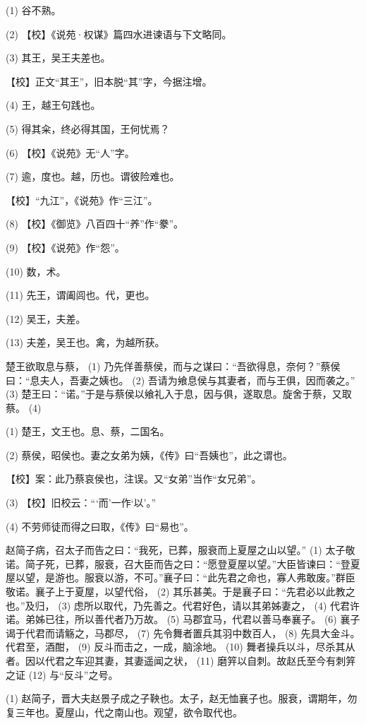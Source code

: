 \documentclass[12pt,UTF8]{ctexbook}
\begin{document}
(1) 谷不熟。

(2) 【校】《说苑·权谋》篇四水进谏语与下文略同。

(3) 其王，吴王夫差也。

【校】正文“其王”，旧本脱“其”字，今据注增。

(4) 王，越王句践也。

(5) 得其籴，终必得其国，王何忧焉？

(6) 【校】《说苑》无“人”字。

(7) 逾，度也。越，历也。谓彼险难也。

【校】“九江”，《说苑》作“三江”。

(8) 【校】《御览》八百四十“养”作“豢”。

(9) 【校】《说苑》作“怨”。

(10) 数，术。

(11) 先王，谓阖闾也。代，更也。

(12) 吴王，夫差。

(13) 夫差，吴王也。禽，为越所获。

楚王欲取息与蔡， (1) 乃先佯善蔡侯，而与之谋曰：“吾欲得息，奈何？”蔡侯曰：“息夫人，吾妻之姨也。 (2) 吾请为飨息侯与其妻者，而与王俱，因而袭之。” (3) 楚王曰：“诺。”于是与蔡侯以飨礼入于息，因与俱，遂取息。旋舍于蔡，又取蔡。 (4)

(1) 楚王，文王也。息、蔡，二国名。

(2) 蔡侯，昭侯也。妻之女弟为姨，《传》曰“吾姨也”，此之谓也。

【校】案：此乃蔡哀侯也，注误。又“女弟”当作“女兄弟”。

(3) 【校】旧校云：“‘而’一作‘以’。”

(4) 不劳师徒而得之曰取，《传》曰“易也”。

赵简子病，召太子而告之曰：“我死，已葬，服衰而上夏屋之山以望。” (1) 太子敬诺。简子死，已葬，服衰，召大臣而告之曰：“愿登夏屋以望。”大臣皆谏曰：“登夏屋以望，是游也。服衰以游，不可。”襄子曰：“此先君之命也，寡人弗敢废。”群臣敬诺。襄子上于夏屋，以望代俗， (2) 其乐甚美。于是襄子曰：“先君必以此教之也。”及归， (3) 虑所以取代，乃先善之。代君好色，请以其弟姊妻之， (4) 代君许诺。弟姊已往，所以善代者乃万故。 (5) 马郡宜马，代君以善马奉襄子。 (6) 襄子谒于代君而请觞之，马郡尽， (7) 先令舞者置兵其羽中数百人， (8) 先具大金斗。代君至，酒酣， (9) 反斗而击之，一成，脑涂地。 (10) 舞者操兵以斗，尽杀其从者。因以代君之车迎其妻，其妻遥闻之状， (11) 磨笄以自刺。故赵氏至今有刺笄之证 (12) 与“反斗”之号。

(1) 赵简子，晋大夫赵景子成之子鞅也。太子，赵无恤襄子也。服衰，谓期年，勿复三年也。夏屋山，代之南山也。观望，欲令取代也。
\end{document}
